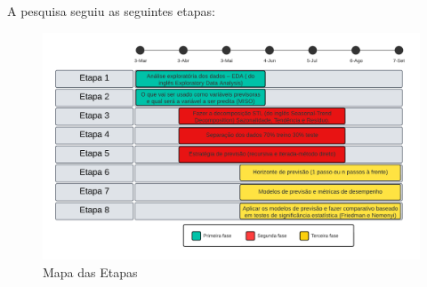     
    A pesquisa seguiu as seguintes etapas:
    \begin{figure}[H]
    	\centering
    	\caption{Mapa das Etapas}
    	\label{fig:etapas}
    	\includegraphics[width=1\linewidth]{Introducao/Figuras/Etapas}
    	
    \end{figure}
